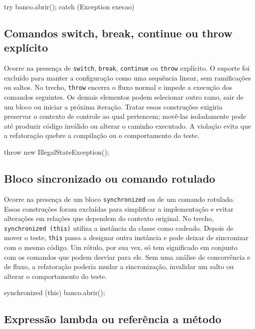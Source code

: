 \begin{violationexample}
try {
    banco.abrir();
} catch (Exception execao) {}
\end{violationexample}

\subsection{Comandos switch, break, continue ou throw explícito}

Ocorre na presença de \texttt{switch}, \texttt{break}, \texttt{continue} ou \texttt{throw} explícito. O suporte foi excluído para manter a configuração como uma sequência linear, sem ramificações ou saltos. No trecho, \texttt{throw} encerra o fluxo normal e impede a execução dos comandos seguintes. Os demais elementos podem selecionar outro ramo, sair de um bloco ou iniciar a próxima iteração. Tratar essas construções exigiria preservar o contexto de controle ao qual pertencem; movê-las isoladamente pode até produzir código inválido ou alterar o caminho executado. A violação evita que a refatoração quebre a compilação ou o comportamento do teste.

\begin{violationexample}
throw new IllegalStateException();
\end{violationexample}

\subsection{Bloco sincronizado ou comando rotulado}

Ocorre na presença de um bloco \texttt{synchronized} ou de um comando rotulado. Essas construções foram excluídas para simplificar a implementação e evitar alterações em relações que dependem do contexto original. No trecho, \texttt{synchronized (this)} utiliza a instância da classe como cadeado. Depois de mover o teste, \texttt{this} passa a designar outra instância e pode deixar de sincronizar com o mesmo código. Um rótulo, por sua vez, só tem significado em conjunto com os comandos que podem desviar para ele. Sem uma análise de concorrência e de fluxo, a refatoração poderia mudar a sincronização, invalidar um salto ou alterar o comportamento do teste.

\begin{violationexample}
synchronized (this) { banco.abrir(); }
\end{violationexample}

\subsection{Expressão lambda ou referência a método}

